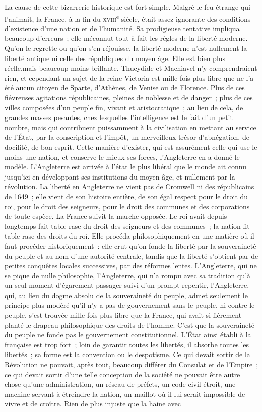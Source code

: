\documentclass[french,twoside]{book} %
\begin{document}
La cause de cette bizarrerie historique est fort simple. Malgré le feu étrange qui l’animait, la France, à la fin du \textsc{xviii}\textsuperscript{e} siècle, était assez ignorante des conditions d’existence d’une nation et de l’humanité. Sa prodigieuse tentative impliqua beaucoup d’erreurs ; elle méconnut tout à fait les règles de la liberté moderne. Qu’on le regrette ou qu’on s’en réjouisse, la liberté moderne n’est nullement la liberté antique ni celle des républiques du moyen âge. Elle est bien plus réelle,mais beaucoup moins brillante. Thucydide et Machiavel n’y comprendraient rien, et cependant un sujet de la reine Victoria est mille fois plus libre que ne l’a été aucun citoyen de Sparte, d’Athènes, de Venise ou de Florence. Plus de ces fiévreuses agitations républicaines, pleines de noblesse et de danger ; plus de ces villes composées d’un peuple fin, vivant et aristocratique ; au lieu de cela, de grandes masses pesantes, chez lesquelles l’intelligence est le fait d’un petit nombre, mais qui contribuent puissamment à la civilisation en mettant au service de l’État, par la conscription et l’impôt, un merveilleux trésor d’abnégation, de docilité, de bon esprit. Cette manière d’exister, qui est assurément celle qui use le moins une nation, et conserve le mieux ses forces, l’Angleterre en a donné le modèle. L’Angleterre est arrivée à l’état le plus libéral que le monde ait connu jusqu’ici en développant ses institutions du moyen âge, et nullement par la révolution. La liberté en Angleterre ne vient pas de Cromwell ni des républicains de 1649 ; elle vient de son histoire entière, de son égal respect pour le droit du roi, pour le droit des seigneurs, pour le droit des communes et des corporations de toute espèce. La France suivit la marche opposée. Le roi avait depuis longtemps fait table rase du droit des seigneurs et des communes ; la nation fit table rase des droits du roi. Elle procéda philosophiquement en une matière où il faut procéder historiquement : elle crut qu’on fonde la liberté par la souveraineté du peuple et au nom d’une autorité centrale, tandis que la liberté s’obtient par de petites conquêtes locales successives, par des réformes lentes. L’Angleterre, qui ne se pique de nulle philosophie, l’Angleterre, qui n’a rompu avec sa tradition qu’à un seul moment d’égarement passager suivi d’un prompt repentir, l’Angleterre, qui, au lieu du dogme absolu de la souveraineté du peuple, admet seulement le principe plus modéré qu’il n’y a pas de gouvernement sans le peuple, ni contre le peuple, s’est trouvée mille fois plus libre que la France, qui avait si fièrement planté le drapeau philosophique des droits de l’homme. C’est que la souveraineté du peuple ne fonde pas le gouvernement constitutionnel. L’État ainsi établi à la française est trop fort ; loin de garantir toutes les libertés, il absorbe toutes les libertés ; sa forme est la convention ou le despotisme. Ce qui devait sortir de la Révolution ne pouvait, après tout, beaucoup différer du Consulat et de l’Empire ; ce qui devait sortir d’une telle conception de la société ne pouvait être autre chose qu’une administration, un réseau de préfets, un code civil étroit, une machine servant à étreindre la nation, un maillot où il lui serait impossible de vivre et de croître. Rien de plus injuste que la haine avec 
\end{document}
